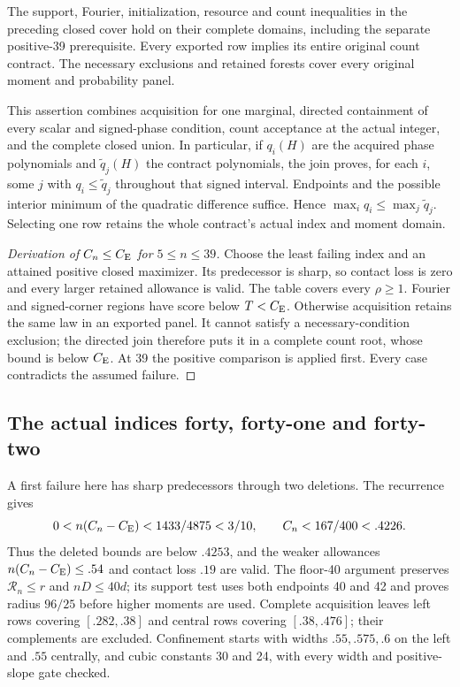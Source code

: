 \begin{proposition}
\label{j:finite:numerical539}
The support, Fourier, initialization, resource and count inequalities
in the preceding closed cover hold on their complete domains, including
the separate positive-39 prerequisite. Every exported row implies its
entire original count contract. The necessary exclusions and retained
forests cover every original moment and probability panel.
\end{proposition}
This assertion combines acquisition for one marginal, directed
containment of every scalar and signed-phase condition, count acceptance
at the actual integer, and the complete closed union. In particular,
if $q_i(H)$ are the acquired phase polynomials and
$\widetilde q_j(H)$ the contract polynomials, the join proves, for each
$i$, some $j$ with $q_i\le\widetilde q_j$ throughout that signed interval.
Endpoints and the possible interior minimum of the quadratic difference
suffice. Hence $\max_iq_i\le\max_j\widetilde q_j$. Selecting one row
retains the whole contract's actual index and moment domain.

\begin{proof}[Derivation of $C_n\le C_{\mathrm E}$ for $5\le n\le39$]
Choose the least failing index and an attained positive closed maximizer.
Its predecessor is sharp, so contact loss is zero and every larger
retained allowance is valid. The table covers every $\rho\ge1$.
Fourier and signed-corner regions have score below $T<C_{\mathrm E}$.
Otherwise acquisition retains the same law in an exported panel.
It cannot satisfy a necessary-condition exclusion; the directed join
therefore puts it in a complete count root, whose bound is below $C_{\mathrm E}$.
At 39 the positive comparison is applied first. Every case contradicts
the assumed failure.
\end{proof}

\subsection{The actual indices forty, forty-one and forty-two}
\label{j:finite:4042}
A first failure here has sharp predecessors through two deletions.
The recurrence gives
\[
 0<n(C_n-C_{\mathrm E})<1433/4875<3/10,\qquad C_n<167/400<.4226.
\]
Thus the deleted bounds are below $.4253$, and the weaker allowances
$n(C_n-C_{\mathrm E})\le.54$ and contact loss $.19$ are valid.
The floor-40 argument preserves $\mathcal R_n\le r$ and $nD\le40d$;
its support test uses both endpoints 40 and 42 and proves radius $96/25$
before higher moments are used. Complete acquisition leaves left rows
covering $[.282,.38]$ and central rows covering $[.38,.476]$; their
complements are excluded. Confinement starts with widths
$.55,.575,.6$ on the left and $.55$ centrally, and cubic constants
30 and 24, with every width and positive-slope gate checked.

